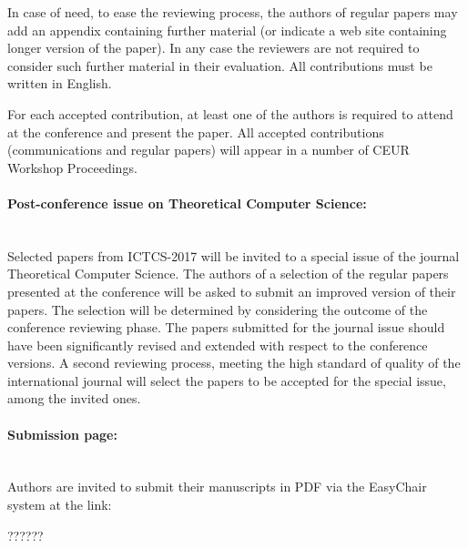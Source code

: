 \documentclass[11pt]{article}
\begin{document}
\begin{spacing}{1}
In case of need, to ease the reviewing process, the authors of regular
papers may add an appendix containing further material (or indicate a
web site containing longer version of the paper). In any case the
reviewers are not required to consider such further material in their
evaluation. All contributions must be written in English.

For each accepted contribution, at least one of the authors is
required to attend at the conference and present the paper. All
accepted contributions (communications and regular papers) will appear
in a number of CEUR Workshop Proceedings.



\paragraph{Post-conference issue on Theoretical Computer Science:}
~\\

Selected papers from ICTCS-2017 will be invited to a special issue
of the journal Theoretical Computer Science.
The authors of a selection of the regular papers presented at the
conference will be asked to submit an improved version of their papers.
The selection will be determined by considering the outcome of the
conference reviewing phase.
The papers submitted for the journal issue should have been significantly
revised and extended with respect to the conference versions.
A second reviewing process, meeting the high standard of quality of the
international journal will select the papers to be accepted for the
special issue, among the invited ones.

\paragraph{Submission page:}
~\\

Authors are invited to submit their manuscripts in PDF via the
EasyChair system at the link: 

??????

\end{spacing}
\end{document}
